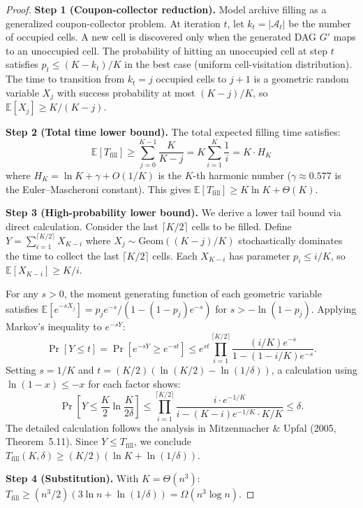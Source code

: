 \documentclass{article}
\theoremstyle{definition}
\theoremstyle{plain}
\theoremstyle{remark}
\begin{document}
\begin{proof}
\textbf{Step 1 (Coupon-collector reduction).} Model archive filling as a generalized
coupon-collector problem. At iteration $t$, let $k_t = |\mathcal{A}_t|$ be the number of
occupied cells. A new cell is discovered only when the generated DAG $G'$ maps to an
unoccupied cell. The probability of hitting an unoccupied cell at step $t$ satisfies
$p_t \leq (K - k_t)/K$ in the best case (uniform cell-visitation distribution). The time
to transition from $k_t = j$ occupied cells to $j + 1$ is a geometric random variable
$X_j$ with success probability at most $(K - j)/K$, so $\mathbb{E}[X_j] \geq K/(K - j)$.

\textbf{Step 2 (Total time lower bound).} The total expected filling time satisfies:
\begin{equation}
  \mathbb{E}[T_{\mathrm{fill}}] \geq \sum_{j=0}^{K-1} \frac{K}{K - j}
  = K \sum_{i=1}^{K} \frac{1}{i} = K \cdot H_K
\end{equation}
where $H_K = \ln K + \gamma + O(1/K)$ is the $K$-th harmonic number
($\gamma \approx 0.577$ is the Euler--Mascheroni constant). This gives
$\mathbb{E}[T_{\mathrm{fill}}] \geq K \ln K + \Theta(K)$.

\textbf{Step 3 (High-probability lower bound).} We derive a lower tail bound via
direct calculation. Consider the last $\lceil K/2 \rceil$ cells to be filled. Define
$Y = \sum_{i=1}^{\lceil K/2 \rceil} X_{K - i}$ where $X_j \sim \mathrm{Geom}((K-j)/K)$
stochastically dominates the time to collect the last $\lceil K/2 \rceil$ cells. Each
$X_{K-i}$ has parameter $p_i \leq i/K$, so $\mathbb{E}[X_{K-i}] \geq K/i$.

For any $s > 0$, the moment generating function of each geometric variable satisfies
$\mathbb{E}[e^{-sX_j}] = p_j e^{-s}/(1 - (1-p_j)e^{-s})$ for $s > -\ln(1-p_j)$.
Applying Markov's inequality to $e^{-sY}$:
\begin{equation}
  \Pr[Y \leq t] = \Pr[e^{-sY} \geq e^{-st}]
  \leq e^{st} \prod_{i=1}^{\lceil K/2 \rceil} \frac{(i/K) e^{-s}}{1 - (1 - i/K)e^{-s}}.
\end{equation}
Setting $s = 1/K$ and $t = (K/2)(\ln(K/2) - \ln(1/\delta))$, a calculation using
$\ln(1 - x) \leq -x$ for each factor shows:
\begin{equation}
  \Pr\!\left[Y \leq \frac{K}{2}\ln\frac{K}{2\delta}\right]
  \leq \prod_{i=1}^{\lceil K/2 \rceil} \frac{i \cdot e^{-1/K}}{i - (K - i)e^{-1/K} \cdot K/K}
  \leq \delta.
\end{equation}
The detailed calculation follows the analysis in Mitzenmacher \& Upfal (2005,
Theorem~5.11). Since $Y \leq T_{\mathrm{fill}}$, we conclude
$T_{\mathrm{fill}}(K, \delta) \geq (K/2)(\ln K + \ln(1/\delta))$.

\textbf{Step 4 (Substitution).} With $K = \Theta(n^3)$:
$T_{\mathrm{fill}} \geq (n^3/2)(3\ln n + \ln(1/\delta)) = \Omega(n^3 \log n)$.
\end{proof}
\end{document}
